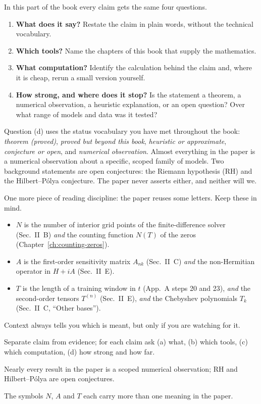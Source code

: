 In this part of the book every claim gets the same four questions.
\begin{enumerate}
\item[(a)] \textbf{What does it say?} Restate the claim in plain words, without the technical vocabulary.
\item[(b)] \textbf{Which tools?} Name the chapters of this book that supply the mathematics.
\item[(c)] \textbf{What computation?} Identify the calculation behind the claim and, where it is cheap, rerun a small version yourself.
\item[(d)] \textbf{How strong, and where does it stop?} Is the statement a theorem, a numerical observation, a heuristic explanation, or an open question? Over what range of models and data was it tested?
\end{enumerate}

Question (d) uses the status vocabulary you have met throughout the book: \emph{theorem (proved)}, \emph{proved but beyond this book}, \emph{heuristic or approximate}, \emph{conjecture or open}, and \emph{numerical observation}. Almost everything in the paper is a numerical observation about a specific, scoped family of models. Two background statements are open conjectures: the Riemann hypothesis (RH) and the Hilbert--P\'olya conjecture. The paper never asserts either, and neither will we.

One more piece of reading discipline: the paper reuses some letters. Keep these in mind.
\begin{itemize}
\item $N$ is the number of interior grid points of the finite-difference solver (Sec.~II~B) \emph{and} the counting function $N(T)$ of the zeros (Chapter~\ref{ch:counting-zeros}).
\item $A$ is the first-order sensitivity matrix $A_{nk}$ (Sec.~II~C) \emph{and} the non-Hermitian operator in $H+iA$ (Sec.~II~E).
\item $T$ is the length of a training window in $t$ (App.~A steps 20 and 23), \emph{and} the second-order tensors $T^{(n)}$ (Sec.~II~E), \emph{and} the Chebyshev polynomials $T_k$ (Sec.~II~C, ``Other bases'').
\end{itemize}
Context always tells you which is meant, but only if you are watching for it.

\begin{keyideas}
\item Separate claim from evidence; for each claim ask (a) what, (b) which tools, (c) which computation, (d) how strong and how far.
\item Nearly every result in the paper is a scoped numerical observation; RH and Hilbert--P\'olya are open conjectures.
\item The symbols $N$, $A$ and $T$ each carry more than one meaning in the paper.
\end{keyideas}

